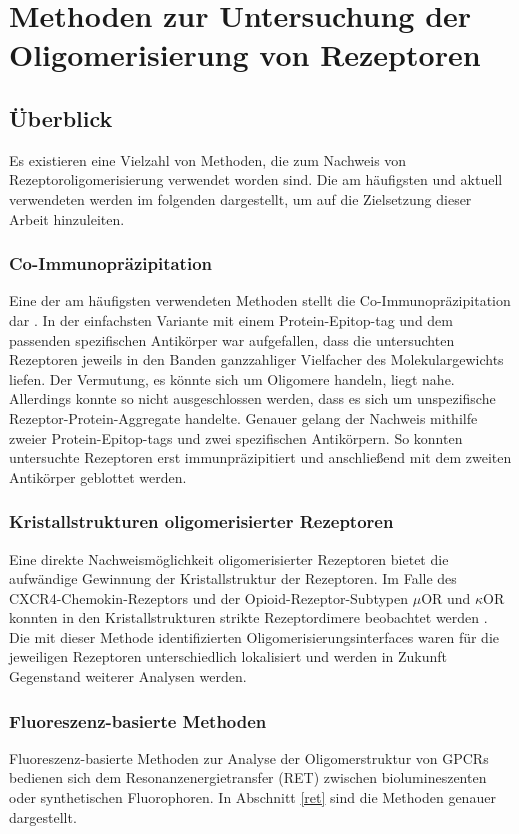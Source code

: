 \section{Methoden zur Untersuchung der Oligomerisierung von Rezeptoren}
\subsection{Überblick}
Es existieren eine Vielzahl von Methoden, die zum Nachweis von Rezeptoroligomerisierung verwendet worden sind. Die am häufigsten und aktuell verwendeten werden im folgenden dargestellt, um auf die Zielsetzung dieser Arbeit hinzuleiten.

\subsubsection {Co-Immunopräzipitation}
Eine der am häufigsten verwendeten Methoden stellt die Co-Immunopräzipitation dar \parencite{Hebert1996, Jordan1999, Hillion2002, Park2004}. In der einfachsten Variante mit einem Protein-Epitop-tag und dem passenden spezifischen Antikörper war aufgefallen, dass die untersuchten Rezeptoren jeweils in den Banden ganzzahliger Vielfacher des Molekulargewichts liefen. Der Vermutung, es könnte sich um Oligomere handeln, liegt nahe. Allerdings konnte so nicht ausgeschlossen werden, dass es sich um unspezifische Rezeptor-Protein-Aggregate handelte. Genauer gelang der Nachweis mithilfe zweier Protein-Epitop-tags und zwei spezifischen Antikörpern. So konnten untersuchte Rezeptoren erst immunpräzipitiert und anschließend mit dem zweiten Antikörper geblottet werden.

\subsubsection{Kristallstrukturen oligomerisierter Rezeptoren}
Eine direkte Nachweismöglichkeit oligomerisierter Rezeptoren bietet die aufwändige Gewinnung der Kristallstruktur der Rezeptoren. Im Falle des CXCR4-Chemokin-Rezeptors und der Opioid-Rezeptor-Subtypen $\mu$OR und $\kappa$OR konnten in den Kristallstrukturen strikte Rezeptordimere beobachtet werden \parencite{Wu2010, Manglik2012, Wu2012}. Die mit dieser Methode identifizierten Oligomerisierungsinterfaces waren für die jeweiligen Rezeptoren unterschiedlich lokalisiert und werden in Zukunft Gegenstand weiterer Analysen werden.

\subsubsection{Fluoreszenz-basierte Methoden}
Fluoreszenz-basierte Methoden zur Analyse der Oligomerstruktur von GPCRs bedienen sich dem Resonanzenergietransfer (RET) zwischen biolumineszenten oder synthetischen Fluorophoren. In Abschnitt \ref{ret} sind die Methoden genauer dargestellt.

